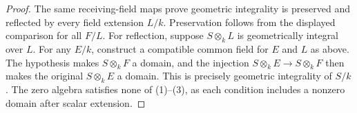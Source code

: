 \begin{proof}
The same receiving-field maps
prove geometric integrality
is preserved and reflected
by every field extension
$L/k$. Preservation follows
from the displayed comparison
for all $F/L$. For reflection,
suppose $S\otimes_k L$ is
geometrically integral over $L$.
For any $E/k$, construct a
compatible common field for
$E$ and $L$ as above. The
hypothesis makes $S\otimes_k F$
a domain, and the injection
$S\otimes_k E\to S\otimes_k F$
then makes the original
$S\otimes_k E$ a domain.
This is precisely geometric
integrality of $S/k$.
The zero algebra satisfies
none of (1)--(3), as each
condition includes a nonzero
domain after scalar extension.
\end{proof}